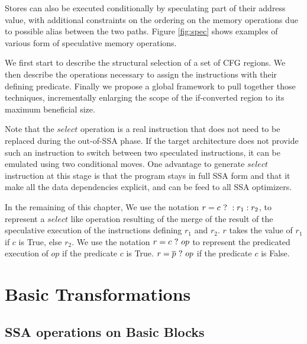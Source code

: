 Stores can also be executed conditionally by speculating part of their address value, with additional constraints on the ordering on the memory operations due to possible alias between the two paths. Figure \ref{fig:spec} shows examples of various form of speculative memory operations.

We first start to describe the structural selection of a set of CFG regions. We then describe the operations necessary to assign the instructions with their defining predicate. Finally we propose a global framework to pull together those techniques, incrementally enlarging the scope of the if-converted region to its maximum beneficial size.

Note that the $select$ operation is a real instruction that does not need to be replaced during the out-of-SSA phase. If the target architecture does not provide such an instruction to switch between two speculated instructions, it can be emulated using two conditional moves. One advantage to generate $select$ instruction at this stage is that the program stays in full SSA form and that it make all the data dependencies explicit, and can be feed to all SSA optimizers. 

In the remaining of this chapter, We use the notation $r = c ~?~ :r_1:r_2$, to represent a $select$ like operation resulting of the merge of the result of the speculative execution of the instructions defining $r_1$ and $r_2$. $r$ takes the value of $r_1$ if $c$ is True, else $r_2$. We use the notation $r = c ~?~ op$ to represent the predicated execution of $op$ if the predicate $c$ is True. $r = \overline{p} ~?~ op$ if the predicate $c$ is False.

\section{Basic Transformations}

\subsection{SSA operations on Basic Blocks}

